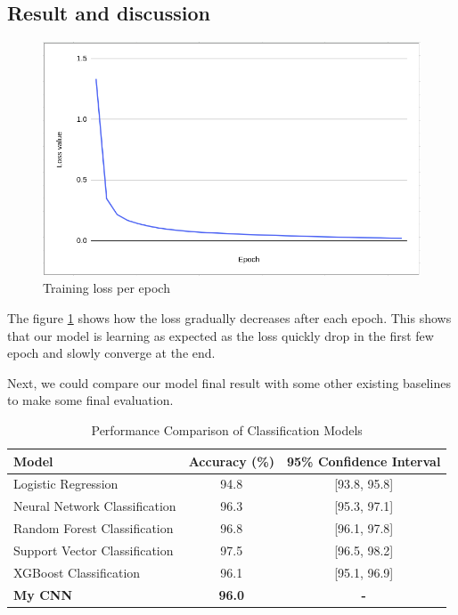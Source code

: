 \documentclass[conference]{IEEEtran}
\begin{document}
\subsection{Result and discussion}
\begin{figure}[H]
    \centering
    \includegraphics[width=1\linewidth]{training.png}
    \caption{Training loss per epoch}
    \label{fig:train_loss}
\end{figure}

The figure \ref{fig:train_loss} shows how the loss gradually decreases after each epoch. This shows that our model is learning as expected as the loss quickly drop in the first few epoch and slowly converge at the end.

Next, we could compare our model final result with some other existing baselines to make some final evaluation.
\begin{table}[H]
\centering
\begin{tabular}{|l|c|c|}
\hline
\textbf{Model} & \textbf{Accuracy (\%)} & \textbf{95\% Confidence Interval} \\
\hline
Logistic Regression & 94.8 & [93.8, 95.8] \\
Neural Network Classification & 96.3 & [95.3, 97.1] \\
Random Forest Classification & 96.8 & [96.1, 97.8] \\
Support Vector Classification & 97.5 & [96.5, 98.2] \\
XGBoost Classification & 96.1 & [95.1, 96.9] \\
\hline
\textbf{My CNN} & \textbf{96.0} & \textbf{-} \\
\hline
\end{tabular}
\vspace{0.2cm}
\caption{Performance Comparison of Classification Models}
\label{tab:model_comparison}
\end{table}
\end{document}
